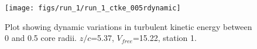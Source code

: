 \begin{figure}[H]
\centering
\texttt{[image: figs/run\_1/run\_1\_ctke\_005rdynamic]}
\caption{Plot showing dynamic variations in turbulent kinetic energy between 0 and 0.5 core radii. $z/c$=5.37, $V_{free}$=15.22, station 1.}
\label{fig:run_1_ctke_005rdynamic}
\end{figure}


